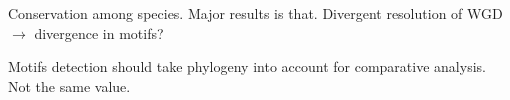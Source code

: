 Conservation among species. Major results is that. Divergent resolution of WGD $\rightarrow$ divergence in motifs?


Motifs detection should take phylogeny into account for comparative analysis. Not the same value.
